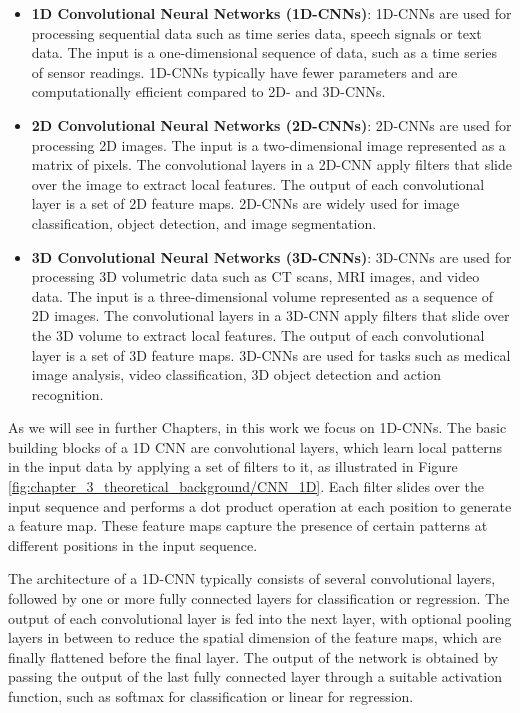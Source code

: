 \begin{itemize}
	
	\item \textbf{1D Convolutional Neural Networks (1D-CNNs)}: 1D-\acp{CNN} are used for processing sequential data such as time series data, speech signals or text data. The input is a one-dimensional sequence of data, such as a time series of sensor readings. 1D-\acp{CNN} typically have fewer parameters and are computationally efficient compared to 2D- and 3D-\acp{CNN}.
	
	\item \textbf{2D Convolutional Neural Networks (2D-CNNs)}: 2D-\acp{CNN} are used for processing 2D images. The input is a two-dimensional image represented as a matrix of pixels. The convolutional layers in a 2D-\ac{CNN} apply filters that slide over the image to extract local features. The output of each convolutional layer is a set of 2D feature maps. 2D-\acp{CNN} are widely used for image classification, object detection, and image segmentation.
	
	\item \textbf{3D Convolutional Neural Networks (3D-CNNs)}: 3D-\acp{CNN} are used for processing 3D volumetric data such as CT scans, MRI images, and video data. The input is a three-dimensional volume represented as a sequence of 2D images. The convolutional layers in a 3D-\ac{CNN} apply filters that slide over the 3D volume to extract local features. The output of each convolutional layer is a set of 3D feature maps. 3D-\acp{CNN} are used for tasks such as medical image analysis, video classification, 3D object detection and action recognition.
	
\end{itemize}

As we will see in further Chapters, in this work we focus on 1D-\acp{CNN}. The basic building blocks of a 1D CNN are convolutional layers, which learn local patterns in the input data by applying a set of filters to it, as illustrated in Figure \ref{fig:chapter_3_theoretical_background/CNN_1D}. Each filter slides over the input sequence and performs a dot product operation at each position to generate a feature map. These feature maps capture the presence of certain patterns at different positions in the input sequence. 
 
The architecture of a 1D-\ac{CNN} typically consists of several convolutional layers, followed by one or more fully connected layers for classification or regression. The output of each convolutional layer is fed into the next layer, with optional pooling layers in between to reduce the spatial dimension of the feature maps, which are finally flattened before the final layer. The output of the network is obtained by passing the output of the last fully connected layer through a suitable activation function, such as softmax for classification or linear for regression.
 
